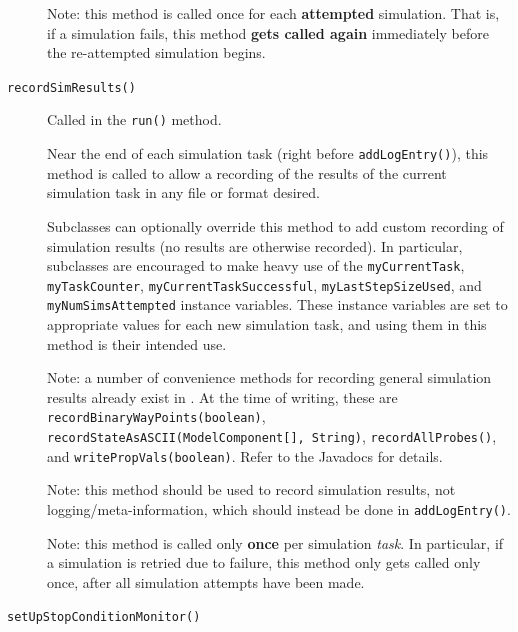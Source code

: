 \documentclass{article}
\begin{document}
\begin{description}
\begin{sideblock}
Note: this method is called once for each \textbf{attempted} simulation. That is, if a simulation fails, this method \textbf{gets called again} immediately before the re-attempted simulation begins.
\end{sideblock}

\item[{\tt recordSimResults()} ] \mbox{}

Called in the {\tt run()} method.

Near the end of each simulation task (right before {\tt addLogEntry()}), this method is called to allow a recording of the results of the current simulation task in any file or format desired.

Subclasses can optionally override this method to add custom recording of simulation results (no results are otherwise recorded). In particular, subclasses are encouraged to make heavy use of the {\tt myCurrentTask}, {\tt myTaskCounter}, {\tt myCurrentTaskSuccessful}, {\tt myLastStepSizeUsed}, and {\tt myNumSimsAttempted} instance variables. These instance variables are set to appropriate values for each new simulation task, and using them in this method is their intended use.

\begin{sideblock}
Note: a number of convenience methods for recording general simulation results already exist in . At the time of writing, these are {\tt recordBinaryWayPoints(boolean)}, {\tt recordStateAsASCII(ModelComponent[], String)}, {\tt recordAllProbes()}, and {\tt writePropVals(boolean)}. Refer to the Javadocs for details.
\end{sideblock}

\begin{sideblock}
Note: this method should be used to record simulation results, not logging/meta-information, which should instead be done in {\tt addLogEntry()}.
\end{sideblock}

\begin{sideblock}
Note: this method is called only \textbf{once} per simulation \textit{task}. In particular, if a simulation is retried due to failure, this method only gets called only once, after all simulation attempts have been made.
\end{sideblock}

\item[{\tt setUpStopConditionMonitor()} ] \mbox{}


\end{description}
\end{document}
